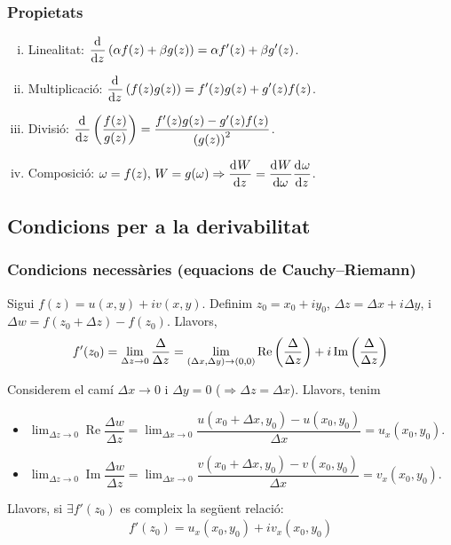 \subsubsection*{Propietats}
\begin{enumerate}[i)]
    \item Linealitat: $\displaystyle \frac{\mathrm{d}^{}}{\mathrm{d} z^{}}\left( \alpha f(z) + \beta g(z) \right) = \alpha f'(z) + \beta g'(z)$.
    \item Multiplicació: $\displaystyle \frac{\mathrm{d}^{}}{\mathrm{d} z^{}} \left( f(z) g(z) \right) = f'(z)g(z) + g'(z)f(z)$.
    \item Divisió: $\displaystyle \frac{\mathrm{d}^{}}{\mathrm{d} z^{}} \left( \frac{f(z)}{g(z)} \right) = \frac{f'(z) g(z) - g'(z) f(z)}{\left( g(z) \right)^{2}}$.
    \item Composició: $\displaystyle \omega = f(z), \, W = g(\omega) \Rightarrow \frac{\mathrm{d}^{}W}{\mathrm{d} z^{}} = \frac{\mathrm{d}^{}W}{\mathrm{d} \omega^{}} \frac{\mathrm{d}^{}\omega}{\mathrm{d} z^{}}$.
\end{enumerate}

\subsection{Condicions per a la derivabilitat}
\subsubsection*{Condicions necessàries (equacions de Cauchy--Riemann)}
Sigui $f(z) = u(x,y) + i v(x,y)$. Definim $z_{0} = x_{0} + i y_{0}$, $\Delta z = \Delta x + i \Delta y$, i $\Delta w = f(z_{0} + \Delta z) - f(z_{0})$. Llavors,
\begin{align}
    f'(z_{0}) = \lim_{\Delta z \to 0} \frac{\Delta}{\Delta z} = \lim_{(\Delta x, \Delta y) \to (0,0)} \operatorname{Re} \left( \frac{\Delta}{\Delta z} \right) + i \operatorname{Im} \left( \frac{\Delta}{\Delta z} \right)
\end{align}

Considerem el camí $\Delta x \to 0$ i $\Delta y = 0$ ($\Rightarrow \Delta z = \Delta x$). Llavors, tenim
\begin{itemize}
    \item $\displaystyle \lim_{\Delta z \to 0} \operatorname{Re} \dfrac{\Delta w}{\Delta z} = \lim_{\Delta x \to 0} \dfrac{u(x_{0} + \Delta x, y_{0}) - u(x_{0}, y_{0})}{\Delta x} = u_{x}(x_{0}, y_{0})$.
    \item $\displaystyle \lim_{\Delta z \to 0} \operatorname{Im} \dfrac{\Delta w}{\Delta z} = \lim_{\Delta x \to 0} \dfrac{v(x_{0} + \Delta x, y_{0}) - v(x_{0}, y_{0})}{\Delta x} = v_{x}(x_{0}, y_{0})$.
\end{itemize}
Llavors, si $\exists f'(z_{0})$ es compleix la següent relació:
\begin{align}\label{eq:c-r1}
    f'(z_{0}) = u_{x}(x_{0},y_{0}) + i v_{x}(x_{0},y_{0})
\end{align}


